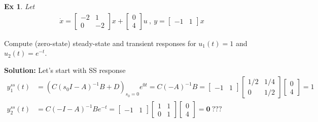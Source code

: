 \documentclass[twoside]{article}
\newtheorem{exmp}[theorem]{Ex}
\begin{document}
\begin{exmp}
Let
\begin{align*} 
\dot{x} = \begin{bmatrix} -2 & 1 \\ 0 & -2 \end{bmatrix} x + \begin{bmatrix} 0 \\ 4 \end{bmatrix} u \ , \ y = \begin{bmatrix} -1 & 1 \end{bmatrix} x 
\end{align*}
\end{exmp}
%
Compute (zero-state) steady-state and transient responses for $u_1(t) = 1$ and $u_2(t) = e^{-t}$.

\textbf{Solution:} Let's start with SS response 
\begin{align*} 
y_1^{ss}(t) &= \left( C \left(s_0 I - A \right)^{-1} B + D \right)_{s_0 = 0} e^{0 t} =
C (-A)^{-1} B =  \begin{bmatrix} -1 & 1 \end{bmatrix}  \begin{bmatrix} 1/2 & 1/4 \\ 0 & 1/2 \end{bmatrix}  \begin{bmatrix} 0 \\ 4 \end{bmatrix} = 1
\\[1ex]
 y_2^{ss}(t) &= C \left(-I - A \right)^{-1} B e^{- t} = \begin{bmatrix} -1 & 1 \end{bmatrix}  \begin{bmatrix} 1 & 1 \\ 0 & 1 \end{bmatrix}  \begin{bmatrix} 0 \\ 4 \end{bmatrix} = \textbf{0} \ ???
\end{align*}
\end{document}
